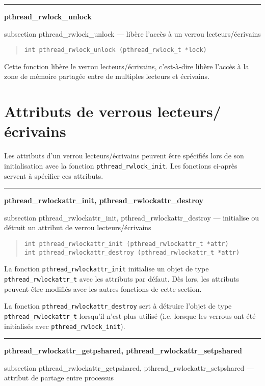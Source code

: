 \documentclass [twoside] {report}
\newcommand {\primitive} [1]
    {
	{\large \bf #1}
	\addcontentsline {toc} {subsection} {#1}
    }
\newcommand {\separation}
    {
	\vspace {7mm}
	\nopagebreak
	\hrule
    }
\begin{document}
\separation
\primitive {pthread\_rwlock\_unlock} --- libère l'accès à un verrou
lecteurs/écrivains

\begin {quote}
\begin {verbatim}
int pthread_rwlock_unlock (pthread_rwlock_t *lock)
\end{verbatim}
\end {quote}

Cette fonction libère le verrou lecteurs/écrivains, c'est-à-dire
libère l'accès à la zone de mémoire partagée entre de multiples
lecteurs et écrivains.


\section {Attributs de verrous lecteurs/écrivains}

Les attributs d'un verrou lecteurs/écrivains peuvent
être spécifiés lors de son initialisation avec la fonction
\verb|pthread_rwlock_init|. Les fonctions ci-après servent à spécifier
ces attributs.

\separation
\primitive {pthread\_rwlockattr\_init, pthread\_rwlockattr\_destroy} ---
initialise ou détruit un attribut de verrou lecteurs/écrivains

\begin {quote}
\begin {verbatim}
int pthread_rwlockattr_init (pthread_rwlockattr_t *attr)
int pthread_rwlockattr_destroy (pthread_rwlockattr_t *attr)
\end{verbatim}
\end {quote}

La fonction \verb|pthread_rwlockattr_init| initialise un objet de type
\verb|pthread_rwlockattr_t| avec les attributs par défaut. Dès lors,
les attributs peuvent être modifiés avec les autres fonctions de
cette section.

La fonction \verb|pthread_rwlockattr_destroy| sert à détruire
l'objet de type \verb|pthread_rwlockattr_t| lorsqu'il n'est plus
utilisé (i.e.  lorsque les verrous ont été initialisés avec
\verb|pthread_rwlock_init|).


\separation
\primitive {pthread\_rwlockattr\_getpshared, pthread\_rwlockattr\_setpshared} --- attribut de partage entre processus
\end{document}
